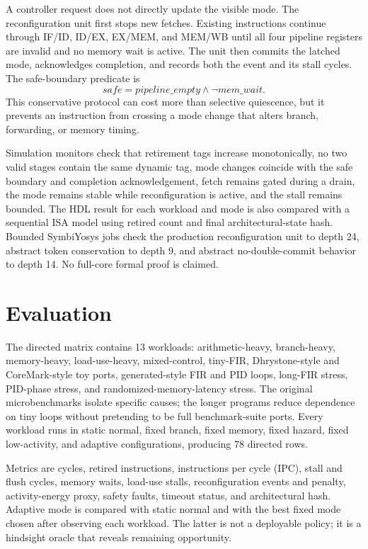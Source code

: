 \documentclass[conference]{IEEEtran}
\begin{document}
A controller request does not directly update the visible mode. The
reconfiguration unit first stops new fetches. Existing instructions continue
through IF/ID, ID/EX, EX/MEM, and MEM/WB until all four pipeline registers are
invalid and no memory wait is active. The unit then commits the latched mode,
acknowledges completion, and records both the event and its stall cycles. The
safe-boundary predicate is
\begin{equation}
\mathit{safe}=\mathit{pipeline\_empty}\land\neg\mathit{mem\_wait}.
\end{equation}
This conservative protocol can cost more than selective quiescence, but it
prevents an instruction from crossing a mode change that alters branch,
forwarding, or memory timing.

Simulation monitors check that retirement tags increase monotonically, no two
valid stages contain the same dynamic tag, mode changes coincide with the safe
boundary and completion acknowledgement, fetch remains gated during a drain,
the mode remains stable while reconfiguration is active, and the stall remains
bounded. The HDL result for each workload and mode is also compared with a
sequential ISA model using retired count and final architectural-state hash.
Bounded SymbiYosys jobs check the production reconfiguration unit to depth 24,
abstract token conservation to depth 9, and abstract no-double-commit behavior
to depth 14. No full-core formal proof is claimed.

\section{Evaluation}

The directed matrix contains 13 workloads: arithmetic-heavy, branch-heavy,
memory-heavy, load-use-heavy, mixed-control, tiny-FIR, Dhrystone-style and
CoreMark-style toy ports, generated-style FIR and PID loops, long-FIR stress,
PID-phase stress, and randomized-memory-latency stress. The original
microbenchmarks isolate specific causes; the longer programs reduce dependence
on tiny loops without pretending to be full benchmark-suite ports. Every
workload runs in static normal, fixed branch, fixed memory, fixed hazard, fixed
low-activity, and adaptive configurations, producing 78 directed rows.

Metrics are cycles, retired instructions, instructions per cycle (IPC), stall
and flush cycles, memory waits, load-use stalls, reconfiguration events and
penalty, activity-energy proxy, safety faults, timeout status, and
architectural hash. Adaptive mode is compared with static normal and with the
best fixed mode chosen after observing each workload. The latter is not a
deployable policy; it is a hindsight oracle that reveals remaining opportunity.
\end{document}
